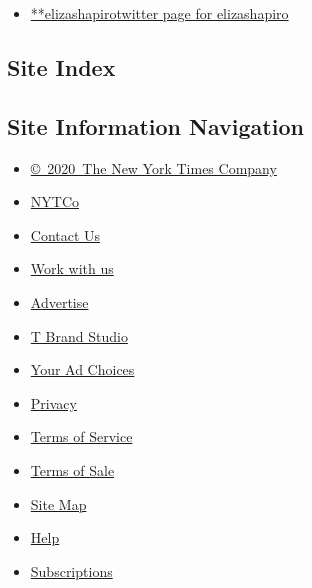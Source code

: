 \begin{itemize}
\tightlist
\item
  \href{https://twitter.com/elizashapiro}{**elizashapirotwitter page for
  elizashapiro}
\end{itemize}

\hypertarget{site-index}{%
\subsection{Site Index}\label{site-index}}

\hypertarget{site-information-navigation}{%
\subsection{Site Information
Navigation}\label{site-information-navigation}}

\begin{itemize}
\tightlist
\item
  \href{https://help.nytimes.com/hc/en-us/articles/115014792127-Copyright-notice}{©~2020~The
  New York Times Company}
\end{itemize}

\begin{itemize}
\tightlist
\item
  \href{https://www.nytco.com/}{NYTCo}
\item
  \href{https://help.nytimes.com/hc/en-us/articles/115015385887-Contact-Us}{Contact
  Us}
\item
  \href{https://www.nytco.com/careers/}{Work with us}
\item
  \href{https://nytmediakit.com/}{Advertise}
\item
  \href{http://www.tbrandstudio.com/}{T Brand Studio}
\item
  \href{https://www.nytimes.com/privacy/cookie-policy\#how-do-i-manage-trackers}{Your
  Ad Choices}
\item
  \href{https://www.nytimes.com/privacy}{Privacy}
\item
  \href{https://help.nytimes.com/hc/en-us/articles/115014893428-Terms-of-service}{Terms
  of Service}
\item
  \href{https://help.nytimes.com/hc/en-us/articles/115014893968-Terms-of-sale}{Terms
  of Sale}
\item
  \href{https://spiderbites.nytimes.com}{Site Map}
\item
  \href{https://help.nytimes.com/hc/en-us}{Help}
\item
  \href{https://www.nytimes.com/subscription?campaignId=37WXW}{Subscriptions}
\end{itemize}
